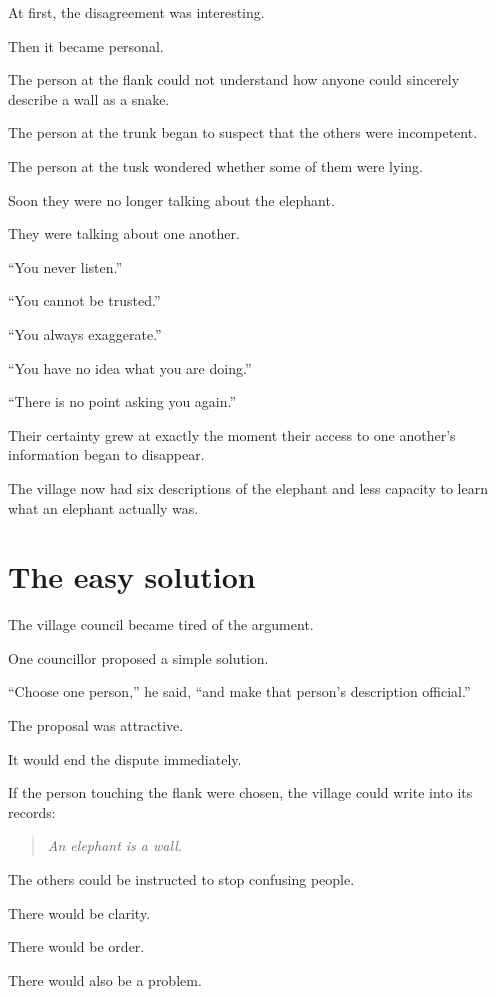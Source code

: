 \documentclass[11pt,a4paper]{article}
\begin{document}
At first, the disagreement was interesting.

Then it became personal.

The person at the flank could not understand how anyone could sincerely describe a wall as a snake.

The person at the trunk began to suspect that the others were incompetent.

The person at the tusk wondered whether some of them were lying.

Soon they were no longer talking about the elephant.

They were talking about one another.

``You never listen.''

``You cannot be trusted.''

``You always exaggerate.''

``You have no idea what you are doing.''

``There is no point asking you again.''

Their certainty grew at exactly the moment their access to one another's information began to disappear.

The village now had six descriptions of the elephant and less capacity to learn what an elephant actually was.

\section*{The easy solution}

The village council became tired of the argument.

One councillor proposed a simple solution.

``Choose one person,'' he said, ``and make that person's description official.''

The proposal was attractive.

It would end the dispute immediately.

If the person touching the flank were chosen, the village could write into its records:

\begin{quote}
\emph{An elephant is a wall.}
\end{quote}

The others could be instructed to stop confusing people.

There would be clarity.

There would be order.

There would also be a problem.
\end{document}
